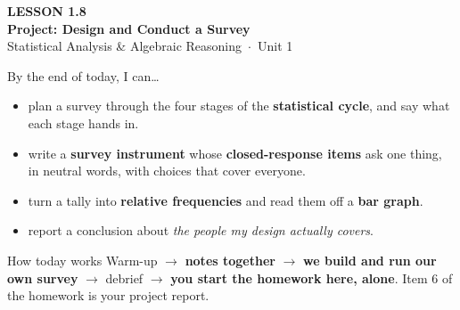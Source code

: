 \documentclass[aspectratio=169, 11pt]{beamer}
\begin{document}
{
\begin{frame}[plain]
  \vspace{2.8cm}\hspace{0.55cm}%
  \begin{minipage}{0.9\textwidth}
    {\color{goldacc}\bfseries\small LESSON 1.8}\\[0.5cm]
    {\color{white}\bfseries\LARGE Project: Design and Conduct a Survey}\\[1.2cm]
    {\color{frostmid}\small Statistical Analysis \& Algebraic Reasoning~$\cdot$~Unit 1}
  \end{minipage}
\end{frame}
}

\begin{frame}[t, plain]
  By the end of today, I can\ldots
  \begin{itemize}\setlength{\itemsep}{5pt}
    \item plan a survey through the four stages of the \textbf{statistical cycle}, and say what
          each stage hands in.
    \item write a \textbf{survey instrument} whose \textbf{closed-response items} ask one thing,
          in neutral words, with choices that cover everyone.
    \item turn a tally into \textbf{relative frequencies} and read them off a \textbf{bar graph}.
    \item report a conclusion about \emph{the people my design actually covers}.
  \end{itemize}
  \begin{block}{How today works}
    Warm-up $\to$ \textbf{notes together} $\to$ \textbf{we build and run our own survey} $\to$
    debrief $\to$ \textbf{you start the homework here, alone}. Item 6 of the homework is your
    project report.
  \end{block}
\end{frame}
\end{document}
